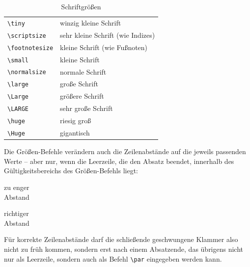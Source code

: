 \begin{table}[!htb]
\caption{Schriftgrößen} \label{sizes}
\def\arraystretch{1.25}
\centering
\begin{tabular}{@{}ll@{}}
\toprule
\lstinline|\tiny|         & \tiny        winzig kleine Schrift \\
\lstinline|\scriptsize|   & \scriptsize  sehr kleine Schrift (wie Indizes)\\
\lstinline|\footnotesize| & \footnotesize     kleine Schrift (wie Fußnoten)\\
\lstinline|\small|        & \small            kleine Schrift \\
\lstinline|\normalsize|   & \normalsize  normale Schrift \\
\lstinline|\large|        & \large       große Schrift \\
\lstinline|\Large|        & \Large       größere Schrift \\
\lstinline|\LARGE|        & \LARGE       sehr große Schrift \\[3pt]
\lstinline|\huge|         & \huge        riesig groß \\[3pt]
\lstinline|\Huge|        & \Huge        gigantisch \\
\bottomrule
\end{tabular}
\end{table}
 
Die Größen-Befehle verändern auch die Zeilenabstände auf
die jeweils passenden Werte -- aber nur, wenn die
Leerzeile, die den Absatz beendet, innerhalb des
Gültigkeitsbereichs des Größen-Befehls liegt:

\begin{LTXexample}
{\Large zu enger \\
Abstand}\par
\end{LTXexample}

\begin{LTXexample}
{\Large richtiger\\
Abstand\par}
\end{LTXexample}

Für korrekte Zeilenabstände darf die
schließende geschwungene Klammer also nicht zu früh kommen,
sondern erst nach einem Absatzende, das übrigens nicht nur als
Leerzeile, sondern auch als Befehl \lstinline|\par|  eingegeben werden 
kann.


